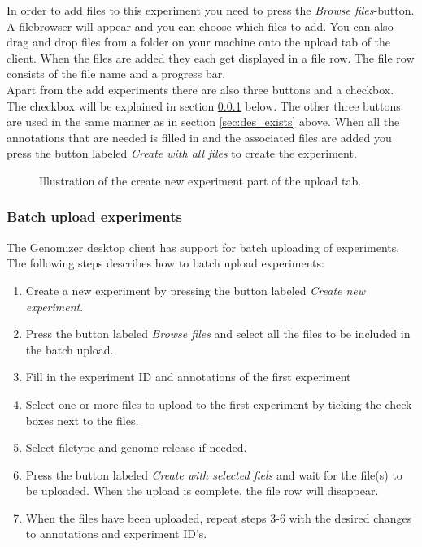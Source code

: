 In order to add files to this experiment you need to press the \textit{Browse files}-button. A filebrowser will appear and you can choose which files to add. You can also drag and drop files from a folder on your machine onto the upload tab of the client. When the files are added they each get displayed in a file row. The file row consists of the file name and a progress bar. \\

Apart from the add experiments there are also three buttons and a checkbox. The checkbox will be explained in section \ref{sec:des_batch} below. The other three buttons are used in the same manner as in section \ref{sec:des_exists} above. When all the annotations that are needed is filled in and the associated files are added you press the button labeled \textit{Create with all files} to create the experiment.

\begin{figure}[h]
	\caption{Illustration of the create new experiment part of the upload tab.}
	\label{fig:des_upload-new}
\end{figure}
\subsubsection{Batch upload experiments}
\label{sec:des_batch}
The Genomizer desktop client has support for batch uploading of experiments. The following steps describes how to batch upload experiments:
\begin{enumerate}
	\item Create a new experiment by pressing the button labeled \textit{Create new experiment}.
	\item Press the button labeled \textit{Browse files} and select all the files to be included in the batch upload.
	\item Fill in the experiment ID and annotations of the first experiment
	\item Select one or more files to upload to the first experiment by ticking the check-boxes next to the files.
	\item Select filetype and genome release if needed.
	\item Press the button labeled \textit{Create with selected fiels} and wait for the file(s) to be uploaded. When the upload is complete, the file row will disappear.
	\item When the files have been uploaded, repeat steps 3-6 with the desired changes to annotations and experiment ID's.
	
\end{enumerate}

